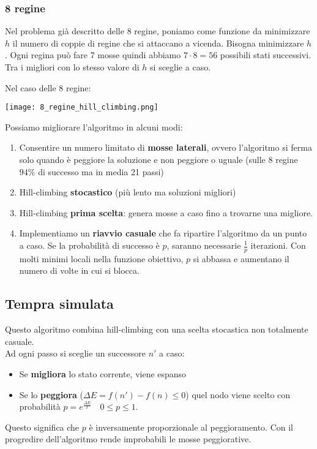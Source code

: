 \subsubsection{8 regine}
Nel problema già descritto delle 8 regine, poniamo come funzione da minimizzare $h$ il numero di coppie di regine che si attaccano a vicenda. Bisogna minimizzare $h$.
Ogni regina può fare 7 mosse quindi abbiamo $7\cdot 8 = 56$ possibili stati successivi. Tra i migliori con lo stesso valore di $h$ si sceglie a caso.
\begin{example}[8 regine]
	Nel caso delle 8 regine:
	\begin{center}
		\texttt{[image: 8\_regine\_hill\_climbing.png]}
	\end{center}
\end{example}
Possiamo migliorare l'algoritmo in alcuni modi:
\begin{enumerate}
	\item Consentire un numero limitato di \textbf{mosse laterali}, ovvero l'algoritmo si ferma solo quando è peggiore la soluzione e non peggiore o uguale (sulle 8 regine $94\%$ di successo ma in media 21 passi)
	\item Hill-climbing \textbf{stocastico} (più lento ma soluzioni migliori)
	\item Hill-climbing \textbf{prima scelta}: genera mosse a caso fino a trovarne una migliore.
	\item Implementiamo un \textbf{riavvio casuale} che fa ripartire l'algoritmo da un punto a caso. Se la probabilità di successo è $p$, saranno necessarie $\frac{1}{p}$ iterazioni. Con molti minimi locali nella funzione obiettivo, $p$ si abbassa e aumentano il numero di volte in cui si blocca.
\end{enumerate}

\subsection{Tempra simulata}
Questo algoritmo combina hill-climbing con una scelta stocastica non totalmente casuale.\\
Ad ogni passo si sceglie un successore $n'$ a caso:
\begin{itemize}
	\item Se \textbf{migliora} lo stato corrente, viene espanso
	\item Se lo \textbf{peggiora} ($\Delta E = f(n')-f(n) \leq 0$) quel nodo viene scelto con probabilità $p=e^{\frac{\Delta E}{T}} \quad 0 \leq p \leq 1$.
\end{itemize}
Questo significa che $p$ è inversamente proporzionale al peggioramento. Con il progredire dell'algoritmo rende improbabili le mosse peggiorative.
